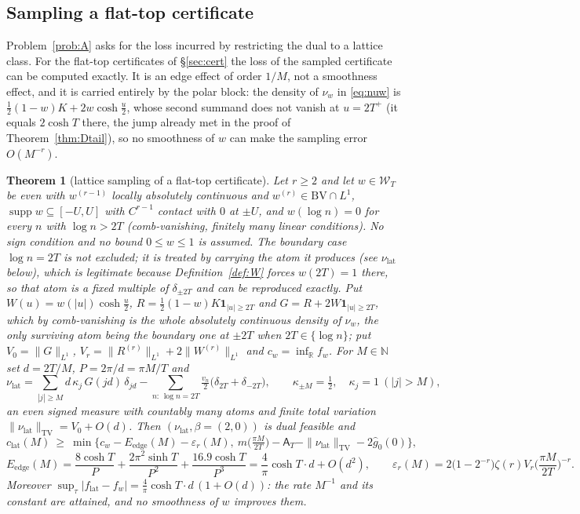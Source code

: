 \documentclass[11pt]{amsart}
\newtheorem{theorem}{Theorem}[section]
\theoremstyle{definition}
\theoremstyle{remark}
\newcommand{\R}{\mathbb R}
\newcommand{\N}{\mathbb N}
\newcommand{\supp}{\operatorname{supp}}
\newcommand{\TV}{\operatorname{TV}}
\newcommand{\gh}[1]{\widehat g_{#1}}
\newcommand{\Wcl}{\mathcal W_T}
\newcommand{\Aconst}{\mathsf A_T}
\begin{document}
\subsection{Sampling a flat-top certificate}\label{subsec:lat}
Problem~\ref{prob:A} asks for the loss incurred by restricting the dual to a lattice class. For the
flat-top certificates of \S\ref{sec:cert} the loss of the sampled certificate can be computed
exactly. It is an edge effect of order $1/M$, not a smoothness effect, and it is carried entirely by
the polar block: the density of $\nu_w$ in \eqref{eq:nuw} is $\frac12(1-w)K+2w\cosh\frac u2$, whose
second summand does not vanish at $u=2T^+$ (it equals $2\cosh T$ there, the jump already met in
the proof of Theorem~\ref{thm:Dtail}), so no smoothness of $w$ can make the sampling error
$O(M^{-r})$.

\begin{theorem}[lattice sampling of a flat-top certificate]\label{thm:AL}
Let $r\ge2$ and let $w\in\Wcl$ be even with $w^{(r-1)}$ locally absolutely continuous and
$w^{(r)}\in \mathrm{BV}\cap L^1$, $\supp w\subseteq[-U,U]$ with $C^{r-1}$ contact with $0$ at $\pm U$,
and $w(\log n)=0$ for every $n$ with $\log n>2T$ \textup{(}comb-vanishing, finitely many linear
conditions\textup{)}. No sign condition and no bound $0\le w\le1$ is assumed. The boundary case
$\log n=2T$ is not excluded; it is treated by carrying the atom it produces \textup{(}see
$\nu_{\mathrm{lat}}$ below\textup{)}, which is legitimate because Definition~\ref{def:W} forces
$w(2T)=1$ there, so that atom is a fixed multiple of $\delta_{\pm2T}$ and can be reproduced exactly.
Put
$W(u)=w(|u|)\cosh\frac u2$, $R=\frac12(1-w)K\mathbf 1_{|u|\ge2T}$ and
$G=R+2W\mathbf 1_{|u|\ge2T}$, which by comb-vanishing is the whole absolutely continuous density
of $\nu_w$, the only surviving atom being the boundary one at $\pm2T$ when $2T\in\{\log n\}$; put
$V_0=\|G\|_{L^1}$, $V_r=\|R^{(r)}\|_{L^1}+2\|W^{(r)}\|_{L^1}$ and $c_w=\inf_\R f_w$. For $M\in\N$ set
$d=2T/M$, $P=2\pi/d=\pi M/T$ and
\[
\nu_{\mathrm{lat}}=\sum_{|j|\ge M}d\,\kappa_j\,G(jd)\,\delta_{jd}
-\sum_{n:\,\log n=2T}\tfrac{v_n}2\big(\delta_{2T}+\delta_{-2T}\big),\qquad
\kappa_{\pm M}=\tfrac12,\quad\kappa_j=1\ (|j|>M),
\]
an even signed measure with countably many atoms and finite total variation
$\|\nu_{\mathrm{lat}}\|_{\TV}=V_0+O(d)$. Then $(\nu_{\mathrm{lat}},\beta=(2,0))$ is dual feasible and
\[
c_{\mathrm{lat}}(M)\ \ge\ \min\Big\{c_w-E_{\mathrm{edge}}(M)-\varepsilon_r(M),\
m\big(\tfrac{\pi M}{2T}\big)-\Aconst-\|\nu_{\mathrm{lat}}\|_{\TV}-2\gh0(0)\Big\},
\]
\[
E_{\mathrm{edge}}(M)=\frac{8\cosh T}{P}+\frac{2\pi^2\sinh T}{P^2}+\frac{16.9\cosh T}{P^3}
=\frac4\pi\cosh T\cdot d+O(d^2),\qquad
\varepsilon_r(M)=2\big(1-2^{-r}\big)\zeta(r)V_r\Big(\frac{\pi M}{2T}\Big)^{-r}.
\]
Moreover $\sup_\tau|f_{\mathrm{lat}}-f_w|=\frac4\pi\cosh T\cdot d\,(1+O(d))$: the rate $M^{-1}$ and
its constant are attained, and no smoothness of $w$ improves them.
\end{theorem}
\end{document}
